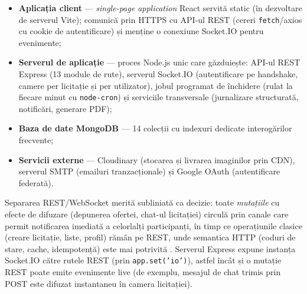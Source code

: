 \begin{itemize}
    \item \textbf{Aplicația client} --- \textit{single-page application} React servită static (în dezvoltare de serverul Vite); comunică prin HTTPS cu API-ul REST (cereri \texttt{fetch}/axios cu cookie de autentificare) și menține o conexiune Socket.IO pentru evenimente;
    \item \textbf{Serverul de aplicație} --- proces Node.js unic care găzduiește: API-ul REST Express (13 module de rute), serverul Socket.IO (autentificare pe handshake, camere per licitație și per utilizator), jobul programat de închidere (rulat la fiecare minut cu \texttt{node-cron}) și serviciile transversale (jurnalizare structurată, notificări, generare PDF);
    \item \textbf{Baza de date MongoDB} --- 14 colecții cu indexuri dedicate interogărilor frecvente;
    \item \textbf{Servicii externe} --- Cloudinary (stocarea și livrarea imaginilor prin CDN), serverul SMTP (emailuri tranzacționale) și Google OAuth (autentificare federată).
\end{itemize}


Separarea REST/WebSocket merită subliniată ca decizie: toate \textit{mutațiile} cu efecte de difuzare (depunerea ofertei, chat-ul licitației) circulă prin canale care permit notificarea imediată a celorlalți participanți, în timp ce operațiunile clasice (creare licitație, liste, profil) rămân pe REST, unde semantica HTTP (coduri de stare, cache, idempotență) este mai potrivită \cite{fielding2000}. Serverul Express expune instanța Socket.IO către rutele REST (prin \texttt{app.set('io')}), astfel încât și o mutație REST poate emite evenimente live (de exemplu, mesajul de chat trimis prin POST este difuzat instantaneu în camera licitației).

